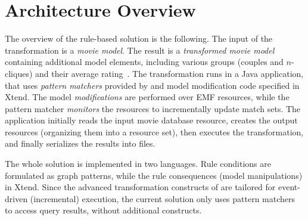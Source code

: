 \section{Architecture Overview}
\label{sec:overview}

The overview of the rule-based solution is the following. The input of the transformation is a \emph{movie model}. The result is a \emph{transformed movie model} containing additional model elements, including various groups (couples and $n$-cliques) and their average rating~\cite{Horn14}. The transformation runs in a Java application, that uses \emph{pattern matchers} provided by \incquery{} and model modification code specified in Xtend.
The model \emph{modifications} are performed over EMF resources, while the pattern matcher \emph{monitors} the resources to incrementally update match sets.
The application initially reads the input movie database resource, creates the output resources (organizing them into a resource set), then executes the transformation, and finally serializes the results into files.



The whole solution is implemented in two languages. Rule conditions are formulated as \incquery{} graph patterns, while the rule consequences (model manipulations) in Xtend. Since the advanced transformation constructs of \incquery{} are tailored for event-driven (incremental) execution, the current solution only uses pattern matchers to access query results, without additional constructs.